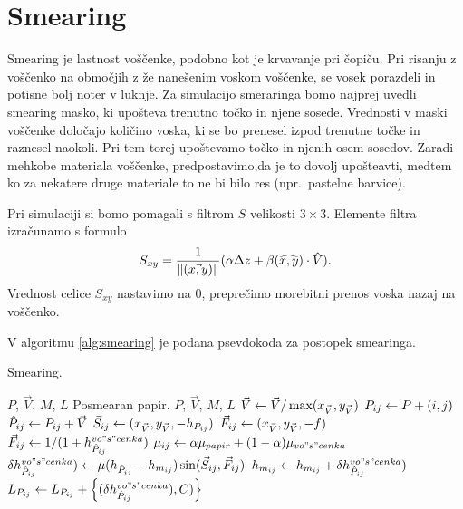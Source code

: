 \section{Smearing}
Smearing je lastnost voščenke, podobno kot je krvavanje pri čopiču. %
Pri risanju z voščenko na območjih z že nanešenim voskom voščenke, se vosek porazdeli in potisne bolj noter v luknje. %
Za simulacijo smeraringa bomo najprej uvedli smearing masko, ki upošteva trenutno točko in njene sosede. Vrednosti v maski voščenke določajo količino voska, ki se bo prenesel izpod trenutne točke in raznesel naokoli. Pri tem torej upoštevamo točko in njenih osem sosedov. Zaradi mehkobe materiala voščenke, predpostavimo,da je to dovolj upošteavti, medtem ko za nekatere druge materiale to ne bi bilo res (npr.\ pastelne barvice).
 
Pri simulaciji si bomo pomagali s filtrom $S$ velikosti $3 \times 3$. Elemente filtra izračunamo s formulo
$$S_{xy} = \frac{1}{\left\|(\vec{x, y})\right\|} (\alpha \Delta z + \beta (\widehat{x, y}) \cdot \hat{V}).$$
Vrednost celice $S_{xy}$ nastavimo na 0, preprečimo morebitni prenos voska nazaj na voščenko. %

V algoritmu \ref{alg:smearing} je podana psevdokoda za postopek smearinga.

%
\begin{algorithm}[htb]
  \caption{Smearing.}
  \label{alg:smearing}
\begin{algorithmic}[1]
\Require $P$, $\vec{V}$, $M$, $L$
\Ensure Posmearan papir.
 {$P$, $\vec{V}$, $M$, $L$} %
  \State $\vec{V} \gets \vec{V}/\max (x_{\vec{V}}, y_{\vec{V}})$
      \State $P_{ij} \gets P + (i, j)$
      \State $\hat{P}_{ij} \gets P_{ij} + \vec{V}$
      \State $\vec{S}_{ij} \gets (x_{\vec{V}}, y_{\vec{V}}, -h_{P_{ij}})$
      \State $\vec{F}_{ij} \gets (x_{\vec{V}}, y_{\vec{V}}, -f)$
      \State $\vec{F}_{ij} \gets 1/(1 + h_{\hat{P}_{ij}}^{vo"s"cenka})$
      \State $\mu_{ij} \gets \alpha \mu_{papir} + (1 - \alpha) \mu_{vo"s"cenka}$
      \State $\delta h_{\hat{P}_{ij}}^{vo"s"cenka}) \gets \mu (h_{\hat{P}_{ij}} - h_{m_{ij}}) \sin (\vec{S}_{ij}, \vec{F}_{ij})$
      \State $h_{m_{ij}} \gets h_{m_{ij}} + \delta h_{\hat{P}_{ij}}^{vo"s"cenka})$ %
      \State $L_{P_{ij}} \gets L_{P_{ij}} + \left\{(\delta h_{\hat{P}_{ij}}^{vo"s"cenka}), C)\right\}$
  \EndFor
\EndFunction
\end{algorithmic}
\end{algorithm}
%
